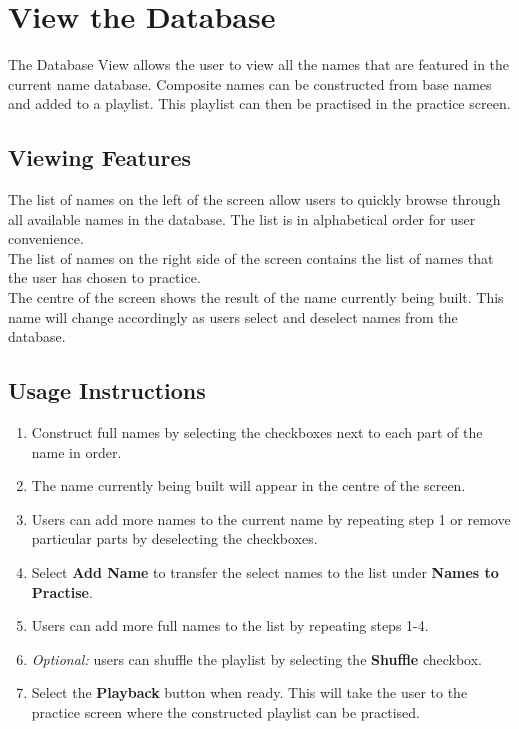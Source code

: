\documentclass{article}
\begin{document}
\section{View the Database}
The Database View allows the user to view all the names that are  featured in
the current name database. Composite names can be constructed from base names
and added to a playlist. This playlist can then be practised in the practice
screen.

\subsection{Viewing Features}
The list of names on the left of the screen allow users to quickly browse
through all available names in the database. The list is in alphabetical order
for user convenience. \\

The list of names on the right side of the screen contains the list of names
that the user has chosen to practice. \\

The centre of the screen shows the result of the name currently being built.
This name will change accordingly as users select and  deselect names from the
database.

\subsection{Usage Instructions}

\begin{enumerate}
	\item Construct full names by selecting the checkboxes next to each part of
	the name in order.

	\item The name currently being built will appear in the centre of the
	screen.

	\item Users can add more names to the current name by repeating step 1 or
	remove particular parts by deselecting the checkboxes.

	\item Select \textbf{Add Name} to transfer the select names to the list
	under \textbf{Names to Practise}.

	\item Users can add more full names to the list by repeating steps 1-4.

	\item {\em Optional: } users can shuffle the playlist by selecting the
	\textbf{Shuffle} checkbox.

	\item Select the \textbf{Playback} button when ready. This will take the
	user to the practice screen where the constructed playlist can be practised.

\end{enumerate}
\end{document}
